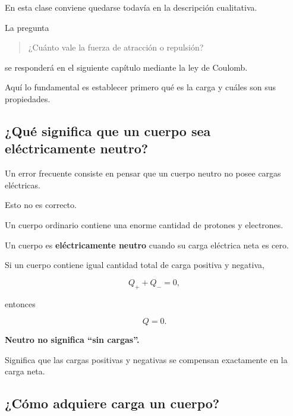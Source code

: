 \begin{notapedagogica}
En esta clase conviene quedarse todavía en la descripción cualitativa.

La pregunta

\begin{quote}
¿Cuánto vale la fuerza de atracción o repulsión?
\end{quote}

se responderá en el siguiente capítulo mediante la ley de Coulomb.

Aquí lo fundamental es establecer primero qué es la carga y cuáles son sus
propiedades.
\end{notapedagogica}



\subsection{¿Qué significa que un cuerpo sea eléctricamente neutro?}

Un error frecuente consiste en pensar que un cuerpo neutro no posee cargas
eléctricas.

Esto no es correcto.

Un cuerpo ordinario contiene una enorme cantidad de protones y electrones.

\begin{definicion}
Un cuerpo es \textbf{eléctricamente neutro} cuando su carga eléctrica neta
es cero.
\end{definicion}

Si un cuerpo contiene igual cantidad total de carga positiva y negativa,

\[
Q_{+}+Q_{-}=0,
\]

entonces

\[
Q=0.
\]

\begin{idea}
\textbf{Neutro no significa ``sin cargas''.}

Significa que las cargas positivas y negativas se compensan exactamente en
la carga neta.
\end{idea}



\subsection{¿Cómo adquiere carga un cuerpo?}

